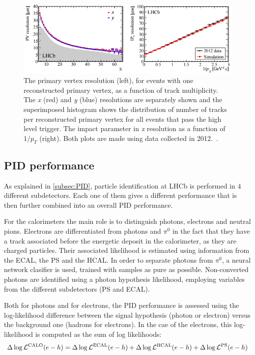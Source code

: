 \begin{figure} [htb!]
\begin{center}
\includegraphics[scale=1.0]{figs/PV_IP.png}
\caption{The primary vertex resolution (left), for events with one reconstructed primary vertex, as a function of track multiplicity. The \textit{x} (red) and \textit{y} (blue) resolutions are separately shown and the superimposed histogram shows the distribution of number of tracks per reconstructed primary vertex for all events that pass the high level trigger. The impact parameter in \textit{x} resolution as a function of $1/p_T$ (right). Both plots are made using data collected in 2012.~\cite{Aaij:2014jba}.\label{fig:lhcb_PV_IP}}
\end{center}
\end{figure}

\subsection{PID performance} %
\label{sec:PIDPerformance}
As explained in \ref{subsec:PID}, particle identification at LHCb is performed in 4 different subdetectors. Each one of them gives a different performance that is then further combined into an overall PID performance. 

For the calorimeters the main role is to distinguish photons, electrons and neutral pions. Electrons are differentiated from photons and $\pi^0$ in the fact that they have a track associated before the energetic deposit in the calorimeter, as they are charged particles. Their associated likelihood is estimated using information from the ECAL, the PS and the HCAL. 
In order to separate photons from $\pi^0$, a neural network clasifier is used, trained with samples as pure as possible. Non-converted photons are identified using a photon hypothesis likelihood, employing variables from the different subdetectors (PS and ECAL). %

Both for photons and for electrons, the PID performance is assessed using the log-likelihood difference between the signal hypothesis (photon or electron) versus the background one (hadrons for electrons). In the cae of the electrons, this log-likelihood is computed as the sum of log likelihoods:
\begin{equation}
\Delta \log{\mathcal{L}^{\rm CALO}(e-h)} = \Delta \log{\mathcal{L}^{\rm ECAL}(e-h)} + \Delta \log{\mathcal{L}^{\rm HCAL}(e-h)} + \Delta \log{\mathcal{L}^{\rm PS}(e-h)} 
\end{equation}

